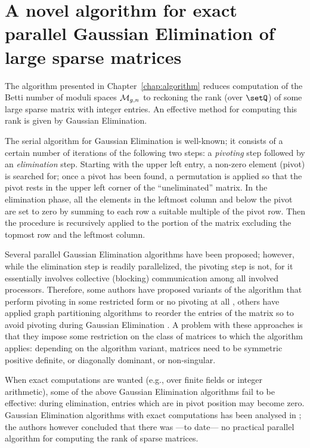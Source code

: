 
\chapter[Parallel Gaussian Elimination]
  {A novel algorithm for exact parallel Gaussian Elimination 
    of large sparse matrices}
\label{chap:rheinfall}

The algorithm presented in Chapter~\ref{chap:algorithm} reduces
computation of the Betti number of moduli spaces $\mathcal{M}_{g,n}$ to
reckoning the rank (over $\setQ$) of some large sparse matrix with
integer entries.  An effective method for computing this rank is given
by Gaussian Elimination.

The serial algorithm for Gaussian Elimination is well-known; it
consists of a certain number of iterations of the following two steps: a
\emph{pivoting} step followed by an \emph{elimination} step.  Starting
with the upper left entry, a non-zero element (pivot) is searched for;
once a pivot has been found, a permutation is applied so that the
pivot rests in the upper left corner of the ``uneliminated'' matrix.
In the elimination phase, all the elements in the leftmost column and
below the pivot are set to zero by summing to each row a suitable
multiple of the pivot row.  Then the procedure is recursively applied
to the portion of the matrix excluding the topmost row and the
leftmost column.

Several parallel Gaussian Elimination algorithms have been proposed;
however, while the elimination step is readily parallelized, the
pivoting step is not, for it essentially involves collective
(blocking) communication among all involved processors.  Therefore,
some authors have proposed variants of the algorithm that perform
pivoting in some restricted form or no pivoting at all \cite{Tiskin99,
  DBLP:journals/corr/abs-0912-2047}, others have applied graph
partitioning algorithms to reorder the entries of the matrix so to
avoid pivoting during Gaussian Elimination \cite{grigoridemmelli07}.
A problem with these approaches is that they impose some restriction
on the class of matrices to which the algorithm applies: depending on
the algorithm variant, matrices need to be symmetric positive
definite, or diagonally dominant, or non-singular.  

When exact computations are wanted (e.g., over finite fields or
integer arithmetic), some of the above Gaussian Elimination algorithms
fail to be effective: during elimination, entries which are in pivot
position may become zero.  Gaussian Elimination algorithms with exact
computations has been analysed in \cite{Dumas02computingthe}; the
authors however concluded that there was ---to date--- no practical
parallel algorithm for computing the rank of sparse matrices.

